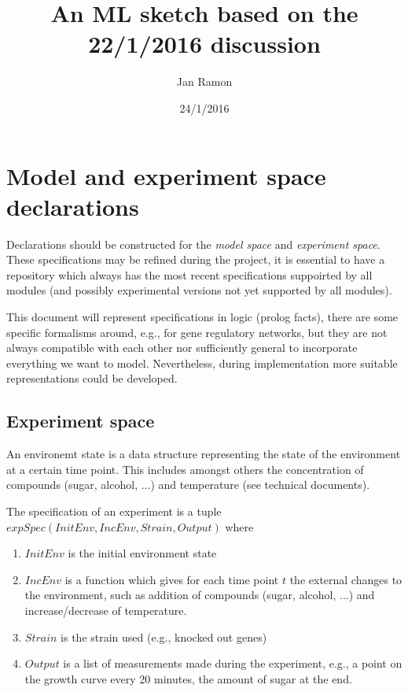 \documentclass{article}
\begin{document}
\newcommand{\probmodelspace}{\mathcal{P}_\mathcal{M}}
\newcommand{\modelspace}{\mathcal{M}}
\newcommand{\expspace}{\mathcal{E}}

\author{Jan Ramon}
\title{An ML sketch based on the 22/1/2016 discussion}
\date{24/1/2016}
\maketitle

\section{Model and experiment space declarations}

Declarations should be constructed for the \textit{model space} and \textit{experiment space}.  These specifications may be refined during the project, it is essential to have a repository which always has the most recent specifications suppoirted by all modules (and possibly experimental versions not yet supported by all modules).

This document will represent specifications in logic (prolog facts),
there are some specific formalisms around, e.g., for gene regulatory networks,
but they are not always compatible with each other nor sufficiently general to
incorporate everything we want to model.
Nevertheless, during implementation more suitable representations could be developed.

\subsection{Experiment space}

An environemt state is a data structure representing the state of the environment at a certain time point.  This includes amongst others the concentration of compounds (sugar, alcohol, ...) and temperature (see technical documents).  

The specification of an experiment is a tuple $expSpec(InitEnv,IncEnv,Strain,Output)$ where
\begin{enumerate}
\item $InitEnv$ is the initial environment state
\item $IncEnv$ is a function which gives for each time point $t$ the external changes to the environment, such as addition of compounds (sugar, alcohol, ...) and increase/decrease of temperature.
\item $Strain$ is the strain used (e.g., knocked out genes)
\item $Output$ is a list of measurements made during the experiment, e.g., a point on the growth curve every 20 minutes, the amount of sugar at the end.
\end{enumerate}
\end{document}
